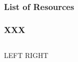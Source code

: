 \begin{frame}[label=x,allowframebreaks]
\frametitle{List of Resources} 

 
\end{frame}




\begin{frame}
\frametitle{XXX}

\begin{columns}
	LEFT
	RIGHT
\end{columns}
\end{frame}

